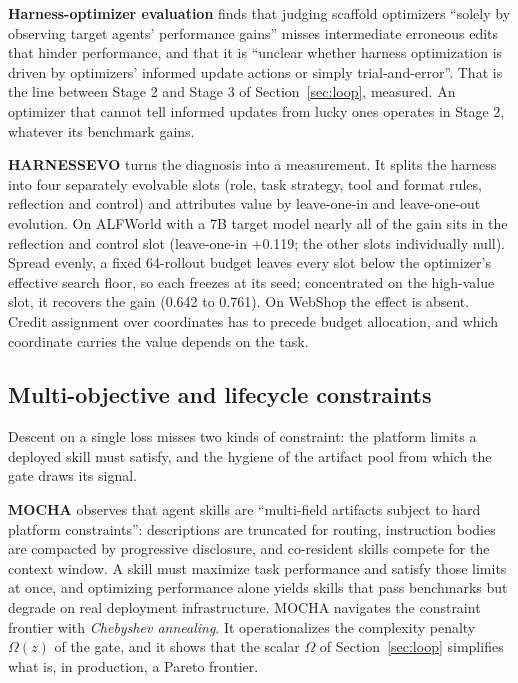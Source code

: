 \documentclass[
  11pt,
]{article}
\begin{document}
\textbf{Harness-optimizer evaluation} \cite{ong2026harnesseval} finds that judging scaffold optimizers ``solely by observing target agents' performance gains'' misses intermediate erroneous edits that hinder performance, and that it is ``unclear whether harness optimization is driven by optimizers' informed update actions or simply trial-and-error''. That is the line between Stage 2 and Stage 3 of Section~\ref{sec:loop}, measured. An optimizer that cannot tell informed updates from lucky ones operates in Stage 2, whatever its benchmark gains.

\textbf{HARNESSEVO} \cite{nguyen2026harnessevo} turns the diagnosis into a measurement. It splits the harness into four separately evolvable slots (role, task strategy, tool and format rules, reflection and control) and attributes value by leave-one-in and leave-one-out evolution. On ALFWorld with a 7B target model nearly all of the gain sits in the reflection and control slot (leave-one-in +0.119; the other slots individually null). Spread evenly, a fixed 64-rollout budget leaves every slot below the optimizer's effective search floor, so each freezes at its seed; concentrated on the high-value slot, it recovers the gain (0.642 to 0.761). On WebShop the effect is absent. Credit assignment over coordinates has to precede budget allocation, and which coordinate carries the value depends on the task.

\subsection{Multi-objective and lifecycle constraints}\label{app:families-7}

Descent on a single loss misses two kinds of constraint: the platform limits a deployed skill must satisfy, and the hygiene of the artifact pool from which the gate draws its signal.

\textbf{MOCHA} \cite{tanjim2026mocha} observes that agent skills are ``multi-field artifacts subject to hard platform constraints'': descriptions are truncated for routing, instruction bodies are compacted by progressive disclosure, and co-resident skills compete for the context window. A skill must maximize task performance and satisfy those limits at once, and optimizing performance alone yields skills that pass benchmarks but degrade on real deployment infrastructure. MOCHA navigates the constraint frontier with \emph{Chebyshev annealing}. It operationalizes the complexity penalty \(\Omega(z)\) of the gate, and it shows that the scalar \(\Omega\) of Section~\ref{sec:loop} simplifies what is, in production, a Pareto frontier.
\end{document}
